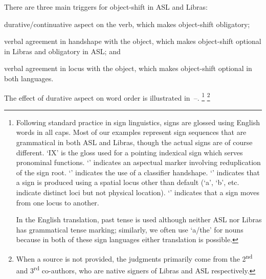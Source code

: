 \documentclass[output=paper]{langscibook}
\begin{document}
There are three main triggers for object-shift in ASL and
Libras: 
\begin{inparaenum}[1.]
    \item durative/continuative aspect on the verb, which makes object-shift obligatory; 
    \item verbal agreement in handshape with the object, which makes object-shift 
    optional in Libras and obligatory in ASL; and 
    \item verbal agreement in locus with the object, which makes object-shift optional in both languages. 
\end{inparaenum}
The effect of durative aspect on word order is illustrated in~--.%
\footnote{
    Following standard practice in sign linguistics, signs are glossed using
    English words in all caps. Most of our examples represent sign sequences that are
    grammatical in both ASL and Libras, though the actual signs are of course different.
    `IX' is the gloss used for a pointing indexical sign which serves
    pronominal functions. `\laszAsp{}' indicates an aspectual marker involving reduplication
    of the sign root. `\laszHs{\_}' indicates the use of a classifier handshape. `\laszLoc{\_}'
    indicates that a sign is produced using a spatial locus other than default (`a', `b',
    etc. indicate distinct loci but not physical location). `\laszDir{\_}{\_}' indicates that a sign
    moves from one locus to another. \par 
    In the English translation, past tense is used although neither ASL nor
    Libras has grammatical tense marking; similarly, we often use `a/the' for nouns
    because in both of these sign languages either translation is possible.
}%
\footnote{When a source is not provided, the judgments primarily come from the
    2\textsuperscript{nd} and 3\textsuperscript{rd} co-authors, who are native signers of Libras and ASL respectively.
}
\ea
    \label{lasz:ex:1}
    \z 
\ex
    \label{lasz:ex:2}
\end{document}
